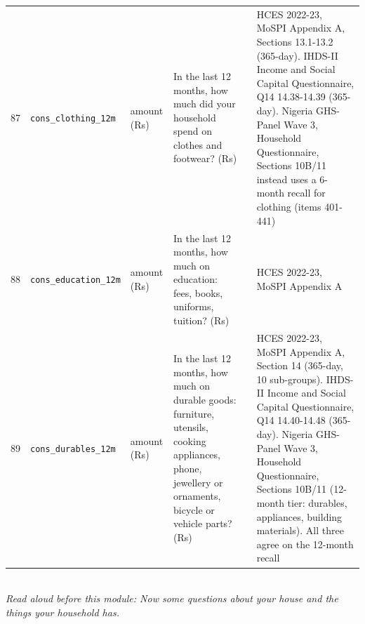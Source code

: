 \documentclass[9pt,a4paper,landscape]{article}
\begin{document}
\begin{longtable}{@{}p{0.5cm}p{3.3cm}p{1.7cm}p{7.3cm}p{5.6cm}p{5.4cm}@{}}
\footnotesize 87 & \footnotesize\texttt{cons\_clothing\_12m} & \scriptsize amount (Rs) & \footnotesize In the last 12 months, how much did your household spend on clothes and footwear? (Rs)\par\vspace{1pt}{\footnotesize\color{hdr}{\hifont पिछले 12 महीनों में आपके घर ने कपड़ों और जूते-चप्पल पर कितना ख़र्च किया? (रुपये)}} & \scriptsize  & \scriptsize HCES 2022-23, MoSPI Appendix A, Sections 13.1-13.2 (365-day). IHDS-II Income and Social Capital Questionnaire, Q14 14.38-14.39 (365-day). Nigeria GHS-Panel Wave 3, Household Questionnaire, Sections 10B/11 instead uses a 6-month recall for clothing (items 401-441)\\
\footnotesize 88 & \footnotesize\texttt{cons\_education\_12m} & \scriptsize amount (Rs) & \footnotesize In the last 12 months, how much on education: fees, books, uniforms, tuition? (Rs)\par\vspace{1pt}{\footnotesize\color{hdr}{\hifont पिछले 12 महीनों में पढ़ाई पर कितना ख़र्च हुआ: फ़ीस, किताबें, ड्रेस, ट्यूशन? (रुपये)}} & \scriptsize  & \scriptsize HCES 2022-23, MoSPI Appendix A\\
\footnotesize 89 & \footnotesize\texttt{cons\_durables\_12m} & \scriptsize amount (Rs) & \footnotesize In the last 12 months, how much on durable goods: furniture, utensils, cooking appliances, phone, jewellery or ornaments, bicycle or vehicle parts? (Rs)\par\vspace{1pt}{\footnotesize\color{hdr}{\hifont पिछले 12 महीनों में सामान पर कितना ख़र्च हुआ: फ़र्नीचर, बर्तन, चूल्हा-मशीन, फ़ोन, गहने, साइकिल या गाड़ी के पुर्ज़े? (रुपये)}} & \scriptsize  & \scriptsize HCES 2022-23, MoSPI Appendix A, Section 14 (365-day, 10 sub-groups). IHDS-II Income and Social Capital Questionnaire, Q14 14.40-14.48 (365-day). Nigeria GHS-Panel Wave 3, Household Questionnaire, Sections 10B/11 (12-month tier: durables, appliances, building materials). All three agree on the 12-month recall\\
\bottomrule\end{longtable}\vspace{6pt}
\\[3pt]
{\small\itshape Read aloud before this module: Now some questions about your house and the things your household has.}\\[5pt]
\end{document}
